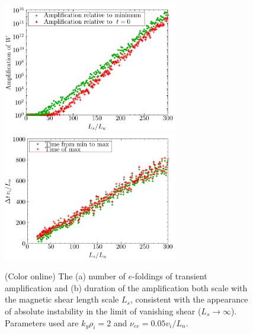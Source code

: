 \documentclass[12pt,superscriptaddress]{revtex4}
\newcommand{\nuee}{\nu_{ee}}
\begin{document}
\begin{figure}[h!]
\includegraphics[width=3in]{m20141121_03_plotTransientAmplificationLsOverLnScanForPaper_a.pdf}
\includegraphics[width=3in]{m20141121_03_plotTransientAmplificationLsOverLnScanForPaper_b.pdf}
\caption{(Color online) The (a) number of $e$-foldings of transient amplification and (b)
duration of the amplification both scale with the magnetic shear length scale $L_s$,
consistent with the appearance of absolute instability in the limit of vanishing shear ($L_s \to \infty$).
Parameters used are $k_y \rho_i = 2$ and $\nuee = 0.05 v_i / L_n$.
\label{fig:transientAmplificationVsLsOverLn}}
\end{figure}
\end{document}
